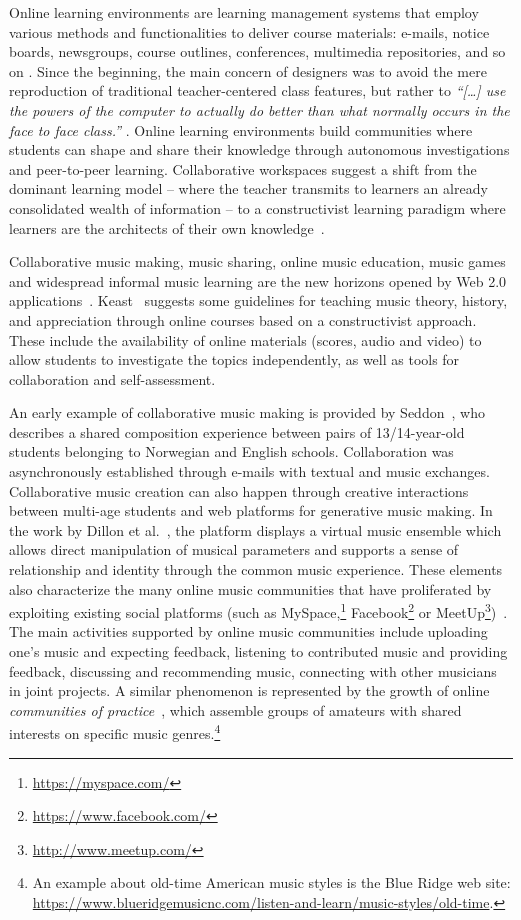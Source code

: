 \documentclass[10pt,journal,compsoc]{IEEEtran}
\begin{document}
Online learning environments are learning management systems that employ various methods and functionalities to deliver course materials: e-mails, notice boards, newsgroups, course outlines, conferences, multimedia repositories, and so on \cite{britain2004framework}.
Since the beginning, the main concern of designers was to avoid the mere reproduction of traditional teacher-centered class features, but rather to \textit{``[\ldots] use the powers of the computer to actually do better than what normally occurs in the face to face class.''} \cite[p. 1]{turoff1995}. Online learning environments build communities where students can shape and share their knowledge through autonomous investigations and peer-to-peer learning.  
Collaborative workspaces suggest a shift from the dominant learning model -- where the teacher transmits to learners an already consolidated wealth of information -- to a constructivist learning paradigm where learners are the architects of their own knowledge~\cite{jonassen1995constructivism}. 

Collaborative music making, music sharing, online music education, music games and widespread informal music learning are the new horizons opened by Web 2.0 applications~\cite{ruismaki2009new}. Keast~\cite{keast2009constructivist} suggests some guidelines for teaching music theory, history, and appreciation through online courses based on a constructivist approach. These include the availability of online materials (scores, audio and video) to allow students to investigate the topics independently, as well as tools for collaboration and self-assessment.  

An early example of collaborative music making is provided by Seddon~\cite{seddon2006collaborative}, who describes a shared composition experience between pairs of 13/14-year-old students belonging to Norwegian and English schools. Collaboration was asynchronously established through e-mails with textual and music exchanges. 
Collaborative music creation can also happen through creative interactions between multi-age students and web platforms for generative music making. In the work by Dillon et al.~\cite{dillon2009communities}, the platform displays a virtual music ensemble which allows direct manipulation of musical parameters and supports a sense of relationship and identity through the common music experience. These elements also characterize the many online music communities that have proliferated by exploiting existing social platforms (such as MySpace,\footnote{\url{https://myspace.com/}}  Facebook\footnote{\url{https://www.facebook.com/}} or MeetUp\footnote{\url{http://www.meetup.com/}})~\cite{salavuo2008social}. The main activities supported by online music communities include uploading one's music and expecting feedback, listening to contributed music and providing feedback, discussing and recommending music, connecting with other musicians in joint projects. 
%
A similar phenomenon is represented by the growth of online \textit{communities of practice}~\cite{waldron2009exploring,wenger1999communities}, which assemble groups of amateurs with shared interests on specific music genres.\footnote{An example about old-time American music styles is the Blue Ridge web site: \url{https://www.blueridgemusicnc.com/listen-and-learn/music-styles/old-time}.}
\end{document}
